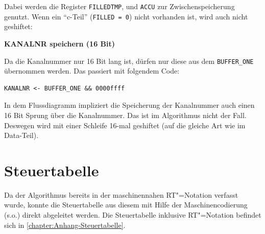 Dabei werden die Register \texttt{FILLEDTMP}, und \texttt{ACCU} zur Zwischenspeicherung genutzt. Wenn ein "`c-Teil"' (\texttt{FILLED = 0}) nicht vorhanden ist, wird auch nicht geshiftet:


\textbf{KANALNR speichern (16 Bit)}

Da die Kanalnummer nur 16 Bit lang ist, dürfen nur diese aus dem \texttt{BUFFER\_ONE} übernommen werden. Das passiert mit folgendem Code:

\begin{verbatim}
KANALNR <- BUFFER_ONE && 0000ffff
\end{verbatim}

In dem Flussdiagramm impliziert die Speicherung der Kanalnummer auch einen 16 Bit Sprung über die Kanalnummer. Das ist im Algorithmus nicht der Fall. Deswegen wird mit einer Schleife 16-mal geshiftet (auf die gleiche Art wie im Data-Teil).





\section{Steuertabelle}
\label{section:Dokumentation-Implementierung-Steuertabelle}

Da der Algorithmus bereits in der maschinennahen RT"=Notation verfasst wurde, konnte die Steuertabelle aus diesem mit Hilfe der Maschinencodierung (s.o.) direkt abgeleitet werden. Die Steuertabelle inklusive RT"=Notation befindet sich in \autoref{chapter:Anhang-Steuertabelle}.
